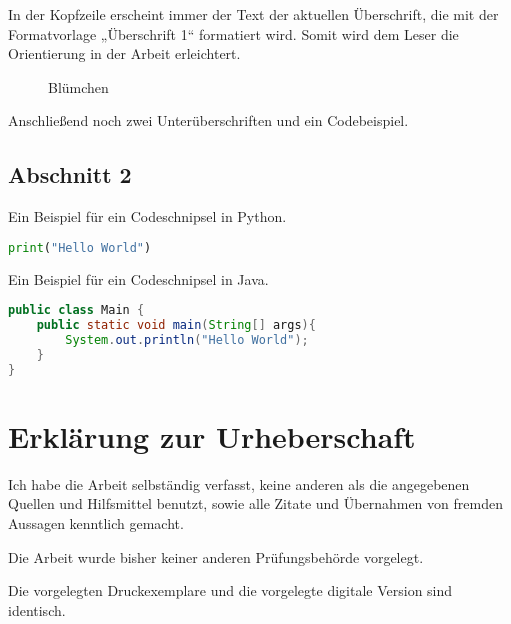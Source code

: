 \documentclass{mi-graduation}
\begin{document}
In der Kopfzeile erscheint immer der Text der aktuellen Überschrift, die mit der Formatvorlage „Überschrift 1“ formatiert wird. Somit wird dem Leser die Orientierung in der Arbeit erleichtert.\\

\begin{figure}[h!]
	\caption{Blümchen \citep{Norman:2002}}
	\label{img:norman2010}
\end{figure}

Anschließend noch zwei Unterüberschriften und ein Codebeispiel.

\subsection{Abschnitt 2}\label{section:2}
Ein Beispiel für ein Codeschnipsel in Python.\\

\begin{lstlisting}[captionpos=b, belowcaptionskip=4pt, caption=Hello World (Python), label=helloworld, language=Python]
print("Hello World")
\end{lstlisting}

Ein Beispiel für ein Codeschnipsel in Java.\\

\begin{lstlisting}[captionpos=b, belowcaptionskip=4pt, caption=Hello World (Java), language=Java]
public class Main {
	public static void main(String[] args){
		System.out.println("Hello World");
	}
}
\end{lstlisting}

\newpage



\newpage
\thispagestyle{plain}
\section*{Erklärung zur Urheberschaft}

\noindent
Ich habe die Arbeit selbständig verfasst, keine anderen als die angegebenen Quellen und Hilfsmittel benutzt, sowie alle Zitate und Übernahmen von fremden Aussagen kenntlich gemacht. 

\noindent
Die Arbeit wurde bisher keiner anderen Prüfungsbehörde vorgelegt. 

\noindent
Die vorgelegten Druckexemplare und die vorgelegte digitale Version sind identisch.
\end{document}
